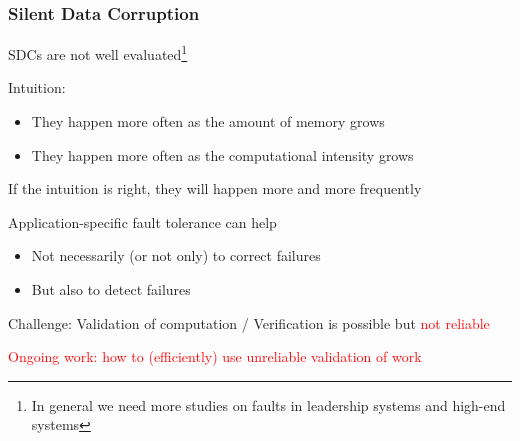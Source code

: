 \begin{frame}
  \frametitle{Silent Data Corruption}

  SDCs are not well evaluated\footnote{In general we need more studies on faults in leadership systems and high-end systems}

  Intuition:
  \begin{itemize}
  \item They happen more often as the amount of memory grows
  \item They happen more often as the computational intensity grows
  \end{itemize}

  If the intuition is right, they will happen more and more frequently

  Application-specific fault tolerance can help
  \begin{itemize}
  \item Not necessarily (or not only) to correct failures
  \item But also to detect failures
  \end{itemize}

  \bigskip

  Challenge: Validation of computation / Verification is possible but \textcolor{red}{not reliable}

  \textcolor{red}{Ongoing work: how to (efficiently) use unreliable validation of work}

\end{frame}

